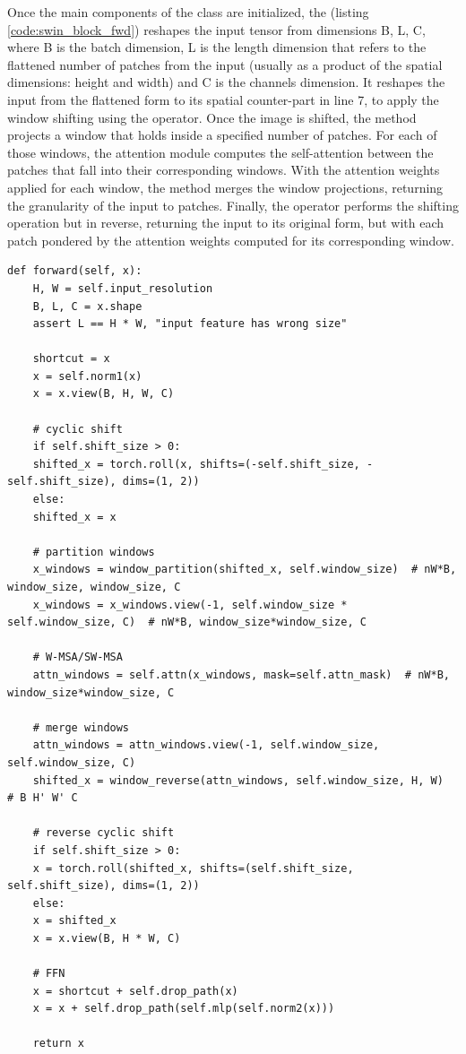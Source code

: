 Once the main components of the class are initialized, the  (listing \ref{code:swin_block_fwd}) reshapes the input tensor from dimensions B, L, C, where B is the batch dimension, L is the length dimension that refers to the flattened number of patches from the input (usually as a product of the spatial dimensions: height and width) and C is the channels dimension. It reshapes the input from the flattened form to its spatial counter-part in line 7, to apply the window shifting using the  operator. Once the image is shifted, the  method projects a window that holds inside a specified number of patches. For each of those windows, the attention module computes the self-attention between the patches that fall into their corresponding windows. With the attention weights applied for each window, the  method merges the window projections, returning the granularity of the input to patches. Finally, the  operator performs the shifting operation but in reverse, returning the input to its original form, but with each patch pondered by the attention weights computed for its corresponding window.

\begin{lstlisting}[caption={Forward method for the SWIN Block module}, label={code:swin_block_fwd}]
	def forward(self, x):
	H, W = self.input_resolution
	B, L, C = x.shape
	assert L == H * W, "input feature has wrong size"
	
	shortcut = x
	x = self.norm1(x)
	x = x.view(B, H, W, C)
	
	# cyclic shift
	if self.shift_size > 0:
	shifted_x = torch.roll(x, shifts=(-self.shift_size, -self.shift_size), dims=(1, 2))
	else:
	shifted_x = x
	
	# partition windows
	x_windows = window_partition(shifted_x, self.window_size)  # nW*B, window_size, window_size, C
	x_windows = x_windows.view(-1, self.window_size * self.window_size, C)  # nW*B, window_size*window_size, C
	
	# W-MSA/SW-MSA
	attn_windows = self.attn(x_windows, mask=self.attn_mask)  # nW*B, window_size*window_size, C
	
	# merge windows
	attn_windows = attn_windows.view(-1, self.window_size, self.window_size, C)
	shifted_x = window_reverse(attn_windows, self.window_size, H, W)  # B H' W' C
	
	# reverse cyclic shift
	if self.shift_size > 0:
	x = torch.roll(shifted_x, shifts=(self.shift_size, self.shift_size), dims=(1, 2))
	else:
	x = shifted_x
	x = x.view(B, H * W, C)
	
	# FFN
	x = shortcut + self.drop_path(x)
	x = x + self.drop_path(self.mlp(self.norm2(x)))
	
	return x
\end{lstlisting}

